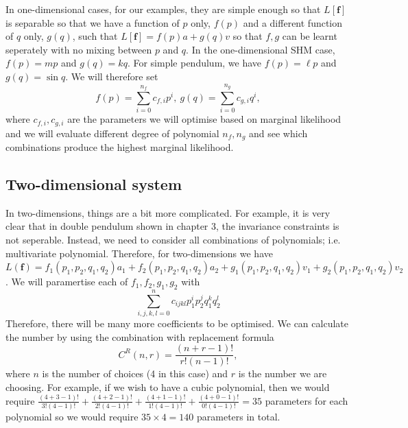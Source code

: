 \documentclass{statsmsc}
\begin{document}
In one-dimensional cases, for our examples, they are simple enough so that $L[\mathbf{f}]$ is separable so that we have a function of $p$ only, $f(p)$ and a different function of $q$ only, $g(q)$, such that $L[\mathbf{f}]=f(p)a+g(q)v$ so that $f, g$ can be learnt seperately with no mixing between $p$ and $q$.
In the one-dimensional SHM case, $f(p)=mp$ and $g(q)=kq$.
For simple pendulum, we have $f(p)=\ell p$ and $g(q)=\sin q$.
We will therefore set $$f(p)=\sum_{i=0}^{n_f}c_{f,i}p^i,\ g(q)=\sum_{i=0}^{n_g}c_{g,i}q^i,$$
where $c_{f,i}, c_{g,i}$ are the parameters we will optimise based on marginal likelihood and we will evaluate different degree of polynomial $n_f, n_g$ and see which combinations produce the highest marginal likelihood. 

\subsection{Two-dimensional system}
In two-dimensions, things are a bit more complicated. 
For example, it is very clear that in double pendulum shown in chapter 3, the invariance constraints is not seperable.
Instead, we need to consider all combinations of polynomials; i.e. multivariate polynomial.
Therefore, for two-dimensions we have $L(\mathbf{f})=f_1(p_1, p_2, q_1, q_2)a_1+f_2(p_1, p_2, q_1, q_2)a_2+g_1(p_1, p_2, q_1, q_2)v_1+g_2(p_1, p_2, q_1, q_2)v_2$.
We will paramertise each of $f_1, f_2, g_1, g_2$ with $$\sum_{i,j,k,l=0}^{n}c_{ijkl}p_1^ip_2^jq_1^kq_2^l$$
Therefore, there will be many more coefficients to be optimised.
We can calculate the number by using the combination with replacement formula
$$
C^R(n, r) = \frac{(n+r-1)!}{r!(n-1)!},
$$
where $n$ is the number of choices (4 in this case) and $r$ is the number we are choosing.
For example, if we wish to have a cubic polynomial, then we would require $\frac{(4+3-1)!}{3!(4-1)!}+\frac{(4+2-1)!}{2!(4-1)!}+\frac{(4+1-1)!}{1!(4-1)!}+\frac{(4+0-1)!}{0!(4-1)!}=35$ parameters for each polynomial so we would require $35\times 4=140$ parameters in total.
\end{document}
